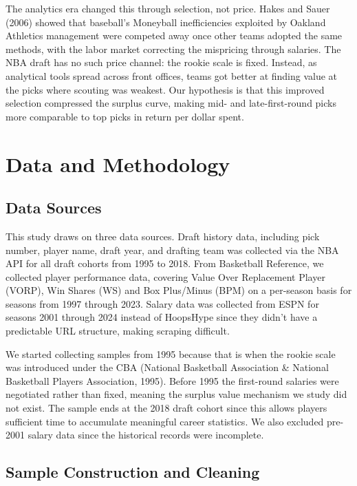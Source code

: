 \documentclass[12pt,letterpaper]{article}
\begin{document}
The analytics era changed this through selection, not price. Hakes and Sauer (2006) showed that baseball's Moneyball inefficiencies exploited by Oakland Athletics management were competed away once other teams adopted the same methods, with the labor market correcting the mispricing through salaries. The NBA draft has no such price channel: the rookie scale is fixed. Instead, as analytical tools spread across front offices, teams got better at finding value at the picks where scouting was weakest. Our hypothesis is that this improved selection compressed the surplus curve, making mid- and late-first-round picks more comparable to top picks in return per dollar spent.


\section{Data and Methodology}

\subsection{Data Sources}

This study draws on three data sources. Draft history data, including pick number, player name, draft year, and drafting team was collected via the NBA API for all draft cohorts from 1995 to 2018. From Basketball Reference, we collected player performance data, covering Value Over Replacement Player (VORP), Win Shares (WS) and Box Plus/Minus (BPM) on a per-season basis for seasons from 1997 through 2023. Salary data was collected from ESPN for seasons 2001 through 2024 instead of HoopsHype since they didn't have a predictable URL structure, making scraping difficult.

We started collecting samples from 1995 because that is when the rookie scale was introduced under the CBA (National Basketball Association \& National Basketball Players Association, 1995). Before 1995 the first-round salaries were negotiated rather than fixed, meaning the surplus value mechanism we study did not exist. The sample ends at the 2018 draft cohort since this allows players sufficient time to accumulate meaningful career statistics. We also excluded pre-2001 salary data since the historical records were incomplete.


\subsection{Sample Construction and Cleaning}
\end{document}
